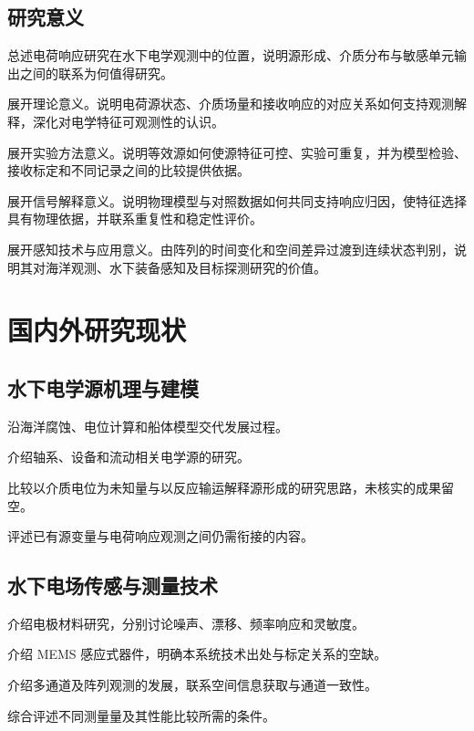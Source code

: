 \subsection{研究意义}
\begin{paragraphplan}
\item 总述电荷响应研究在水下电学观测中的位置，说明源形成、介质分布与敏感单元输出之间的联系为何值得研究。
\item 展开理论意义。说明电荷源状态、介质场量和接收响应的对应关系如何支持观测解释，深化对电学特征可观测性的认识。
\item 展开实验方法意义。说明等效源如何使源特征可控、实验可重复，并为模型检验、接收标定和不同记录之间的比较提供依据。
\item 展开信号解释意义。说明物理模型与对照数据如何共同支持响应归因，使特征选择具有物理依据，并联系重复性和稳定性评价。
\item 展开感知技术与应用意义。由阵列的时间变化和空间差异过渡到连续状态判别，说明其对海洋观测、水下装备感知及目标探测研究的价值。
\end{paragraphplan}

\section{国内外研究现状}
\subsection{水下电学源机理与建模}
\begin{paragraphplan}
\item 沿海洋腐蚀、电位计算和船体模型交代发展过程。
\item 介绍轴系、设备和流动相关电学源的研究。
\item 比较以介质电位为未知量与以反应输运解释源形成的研究思路，未核实的成果留空。
\item 评述已有源变量与电荷响应观测之间仍需衔接的内容。
\end{paragraphplan}
\subsection{水下电场传感与测量技术}
\begin{paragraphplan}
\item 介绍电极材料研究，分别讨论噪声、漂移、频率响应和灵敏度。
\item 介绍 MEMS 感应式器件，明确本系统技术出处与标定关系的空缺。
\item 介绍多通道及阵列观测的发展，联系空间信息获取与通道一致性。
\item 综合评述不同测量量及其性能比较所需的条件。
\end{paragraphplan}
